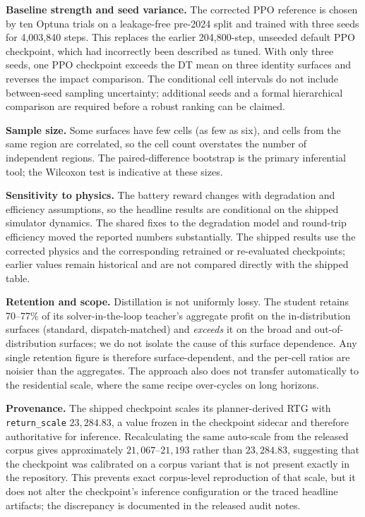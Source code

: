 \documentclass{article}
\begin{document}
\textbf{Baseline strength and seed variance.} The corrected PPO reference is
chosen by ten Optuna trials on a leakage-free pre-2024 split and trained with
three seeds for 4{,}003{,}840 steps. This replaces the earlier 204{,}800-step,
unseeded default PPO checkpoint, which had incorrectly been described as tuned.
With only three seeds, one PPO checkpoint exceeds the DT mean on three identity
surfaces and reverses the impact comparison. The conditional cell intervals do
not include between-seed sampling uncertainty; additional seeds and a formal
hierarchical comparison are required before a robust ranking can be claimed.

\textbf{Sample size.} Some surfaces have few cells (as few as six), and cells
from the same region are correlated, so the cell count overstates the number of
independent regions. The paired-difference bootstrap is the primary inferential
tool; the Wilcoxon test is indicative at these sizes.

\textbf{Sensitivity to physics.} The battery reward changes with degradation
and efficiency assumptions, so the headline results are conditional on the
shipped simulator dynamics. The shared fixes to the degradation model and
round-trip efficiency moved the reported numbers substantially. The shipped
results use the corrected physics and the corresponding retrained or re-evaluated
checkpoints; earlier values remain historical and are not compared directly
with the shipped table.

\textbf{Retention and scope.} Distillation is not uniformly lossy. The student
retains 70--77\% of its solver-in-the-loop teacher's aggregate profit on the
in-distribution surfaces (standard, dispatch-matched) and \emph{exceeds} it on
the broad and out-of-distribution surfaces; we do not isolate the cause of this
surface dependence. Any single retention figure is therefore
surface-dependent, and the per-cell ratios are noisier than the aggregates. The
approach also does not transfer automatically to the residential scale, where the
same recipe over-cycles on long horizons.

\textbf{Provenance.} The shipped checkpoint scales its planner-derived RTG with
\texttt{return\_scale} $23{,}284.83$, a value frozen in the checkpoint sidecar and
therefore authoritative for inference. Recalculating the same auto-scale from
the released corpus gives approximately $21{,}067$--$21{,}193$ rather than
$23{,}284.83$, suggesting that the checkpoint was calibrated on a corpus
variant that is not present exactly in the repository. This prevents exact
corpus-level reproduction of that scale, but it does not alter the checkpoint's
inference configuration or the traced headline artifacts; the discrepancy is
documented in the released audit notes.
\end{document}
